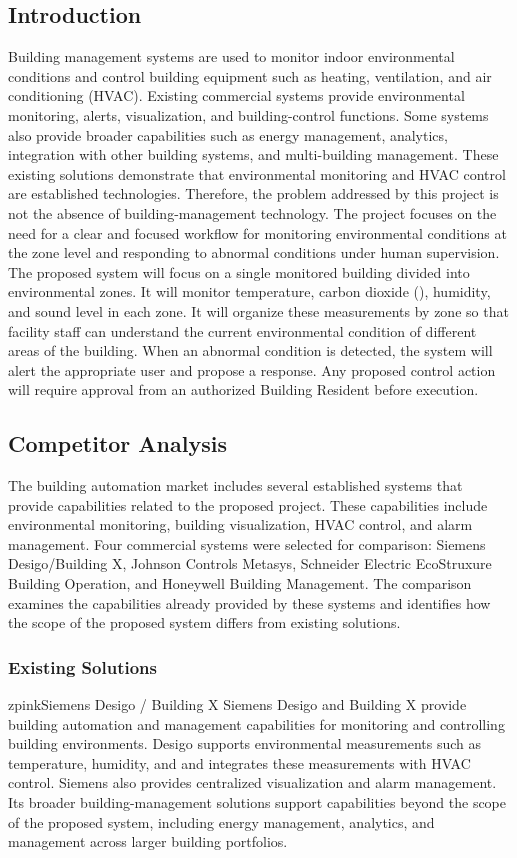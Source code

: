 \documentclass[11pt,a4paper]{article}
\begin{document}
\subsection{Introduction}
Building management systems are used to monitor indoor environmental conditions and control building equipment such as heating, ventilation, and air conditioning (HVAC). Existing commercial systems provide environmental monitoring, alerts, visualization, and building-control functions. Some systems also provide broader capabilities such as energy management, analytics, integration with other building systems, and multi-building management. These existing solutions demonstrate that environmental monitoring and HVAC control are established technologies. Therefore, the problem addressed by this project is not the absence of building-management technology. The project focuses on the need for a clear and focused workflow for monitoring environmental conditions at the zone level and responding to abnormal conditions under human supervision. The proposed system will focus on a single monitored building divided into environmental zones. It will monitor temperature, carbon dioxide (\COtwo), humidity, and sound level in each zone. It will organize these measurements by zone so that facility staff can understand the current environmental condition of different areas of the building. When an abnormal condition is detected, the system will alert the appropriate user and propose a response. Any proposed control action will require approval from an authorized Building Resident before execution.

\subsection{Competitor Analysis}
The building automation market includes several established systems that provide capabilities related to the proposed project. These capabilities include environmental monitoring, building visualization, HVAC control, and alarm management. Four commercial systems were selected for comparison: Siemens Desigo/Building X, Johnson Controls Metasys, Schneider Electric EcoStruxure Building Operation, and Honeywell Building Management. The comparison examines the capabilities already provided by these systems and identifies how the scope of the proposed system differs from existing solutions.

\subsubsection{Existing Solutions}
\begin{company}{zpink}{Siemens Desigo / Building X}
Siemens Desigo and Building X provide building automation and management capabilities for monitoring and controlling building environments. Desigo supports environmental measurements such as temperature, humidity, and \COtwo{} and integrates these measurements with HVAC control. Siemens also provides centralized visualization and alarm management. Its broader building-management solutions support capabilities beyond the scope of the proposed system, including energy management, analytics, and management across larger building portfolios.
\end{company}
\end{document}

